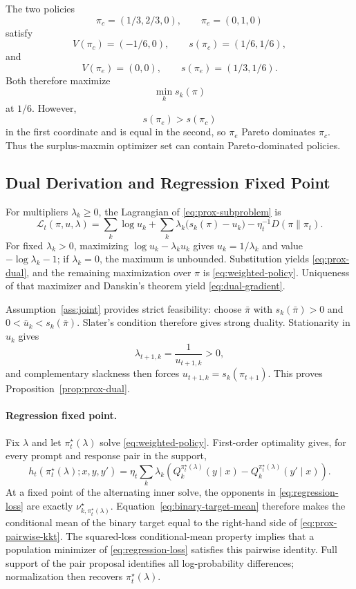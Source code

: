 \documentclass{article}
\theoremstyle{remark}
\theoremstyle{plain}
\begin{document}
The two policies
\[
\pi_c=(1/3,2/3,0),
\qquad
\pi_e=(0,1,0)
\]
satisfy
\[
V(\pi_c)=(-1/6,0),
\qquad
s(\pi_c)=(1/6,1/6),
\]
and
\[
V(\pi_e)=(0,0),
\qquad
s(\pi_e)=(1/3,1/6).
\]
Both therefore maximize
\[
\min_k s_k(\pi)
\]
at $1/6$. However,
\[
s(\pi_e)>s(\pi_c)
\]
in the first coordinate and is equal in the second, so
$\pi_e$ Pareto dominates $\pi_c$. Thus the surplus-maxmin optimizer set
can contain Pareto-dominated policies.

\subsection{Dual Derivation and Regression Fixed Point}
\label{app:prox-dual}
For multipliers $\lambda_k\ge0$, the Lagrangian of \eqref{eq:prox-subproblem} is
\[
\mathcal L_t(\pi,u,\lambda)
=
\sum_k\log u_k
+
\sum_k\lambda_k\bigl(s_k(\pi)-u_k\bigr)
-
\eta_t^{-1}D(\pi\|\pi_t).
\]
For fixed $\lambda_k>0$, maximizing $\log u_k-\lambda_ku_k$ gives $u_k=1/\lambda_k$ and value $-\log\lambda_k-1$; if $\lambda_k=0$, the maximum is unbounded. Substitution yields \eqref{eq:prox-dual}, and the remaining maximization over $\pi$ is \eqref{eq:weighted-policy}. Uniqueness of that maximizer and Danskin's theorem yield \eqref{eq:dual-gradient}.

Assumption~\ref{ass:joint} provides strict feasibility: choose $\bar\pi$ with $s_k(\bar\pi)>0$ and $0<\bar u_k<s_k(\bar\pi)$. Slater's condition therefore gives strong duality. Stationarity in $u_k$ gives
\[
\lambda_{t+1,k}=\frac{1}{u_{t+1,k}}>0,
\]
and complementary slackness then forces $u_{t+1,k}=s_k(\pi_{t+1})$. This proves Proposition~\ref{prop:prox-dual}.

\paragraph{Regression fixed point.}
Fix $\lambda$ and let $\pi_t^\star(\lambda)$ solve \eqref{eq:weighted-policy}. First-order optimality gives, for every prompt and response pair in the support,
\begin{equation}
h_t(\pi_t^\star(\lambda);x,y,y')
=
\eta_t\sum_k\lambda_k
\left(
Q_k^{\pi_t^\star(\lambda)}(y\mid x)
-
Q_k^{\pi_t^\star(\lambda)}(y'\mid x)
\right).
\label{eq:prox-pairwise-kkt}
\end{equation}
At a fixed point of the alternating inner solve, the opponents in \eqref{eq:regression-loss} are exactly $\nu^\star_{k,\pi_t^\star(\lambda)}$. Equation~\eqref{eq:binary-target-mean} therefore makes the conditional mean of the binary target equal to the right-hand side of \eqref{eq:prox-pairwise-kkt}. The squared-loss conditional-mean property implies that a population minimizer of \eqref{eq:regression-loss} satisfies this pairwise identity. Full support of the pair proposal identifies all log-probability differences; normalization then recovers $\pi_t^\star(\lambda)$.
\end{document}
